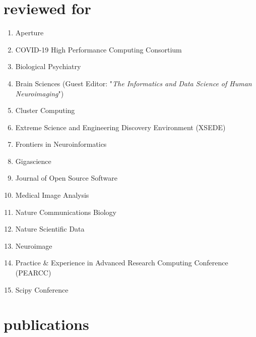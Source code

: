\documentclass[]{friggeri-cv} %
\begin{document}
\section{reviewed for}
\begin{enumerate}
\item Aperture
\item COVID-19 High Performance Computing Consortium
\item Biological Psychiatry
\item Brain Sciences (Guest Editor: "\textit{The Informatics and Data Science of Human Neuroimaging}")
\item Cluster Computing
\item Extreme Science and Engineering Discovery Environment (XSEDE)
\item Frontiers in Neuroinformatics
\item Gigascience
\item Journal of Open Source Software
\item Medical Image Analysis
\item Nature Communications Biology
\item Nature Scientific Data
\item Neuroimage
\item Practice \& Experience in Advanced Research Computing Conference (PEARCC)
\item Scipy Conference
\end{enumerate}

\section{publications}




\end{document}
